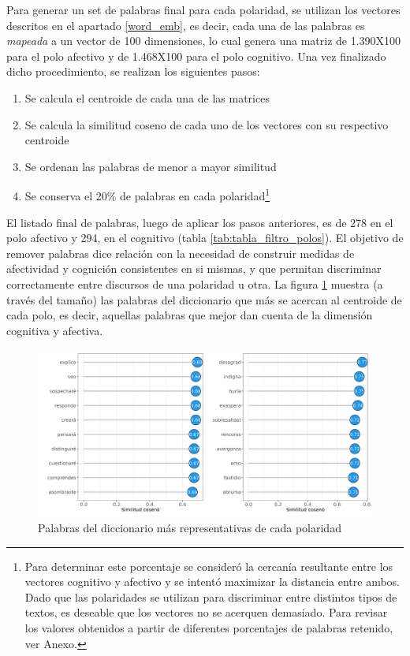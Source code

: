 \documentclass[
  12pt,
]{article}
\providecommand{\tightlist}{%
  \setlength{\itemsep}{0pt}\setlength{\parskip}{0pt}}
\begin{document}
Para generar un set de palabras final para cada polaridad, se utilizan
los vectores descritos en el apartado \ref{word_emb}, es decir, cada una
de las palabras es \emph{mapeada} a un vector de 100 dimensiones, lo
cual genera una matriz de 1.390X100 para el polo afectivo y de 1.468X100
para el polo cognitivo. Una vez finalizado dicho procedimiento, se
realizan los siguientes pasos:

\begin{enumerate}
\def\labelenumi{\arabic{enumi}.}
\tightlist
\item
  Se calcula el centroide de cada una de las matrices
\item
  Se calcula la similitud coseno de cada uno de los vectores con su
  respectivo centroide
\item
  Se ordenan las palabras de menor a mayor similitud
\item
  Se conserva el 20\% de palabras en cada
  polaridad\footnote{Para determinar este porcentaje se consideró la cercanía resultante entre los vectores cognitivo y afectivo y se intentó maximizar la distancia entre ambos. Dado que las polaridades se utilizan para discriminar entre distintos tipos de textos, es deseable que los vectores no se acerquen demasiado. Para revisar los valores obtenidos a partir de diferentes porcentajes de palabras retenido, ver Anexo.}
\end{enumerate}

El listado final de palabras, luego de aplicar los pasos anteriores, es
de 278 en el polo afectivo y 294, en el cognitivo (tabla
\ref{tab:tabla_filtro_polos}). El objetivo de remover palabras dice
relación con la necesidad de construir medidas de afectividad y
cognición consistentes en si mismas, y que permitan discriminar
correctamente entre discursos de una polaridad u otra. La figura
\ref{wordcload} muestra (a través del tamaño) las palabras del
diccionario que más se acercan al centroide de cada polo, es decir,
aquellas palabras que mejor dan cuenta de la dimensión cognitiva y
afectiva.

\begin{figure}[H]
\centering
\large
\caption{Palabras del diccionario más representativas de cada polaridad}
\label{wordcload}
\includegraphics[width = 0.7 \textwidth]{cuadros_tesis/plot_important_words.png}
\end{figure}
\end{document}
